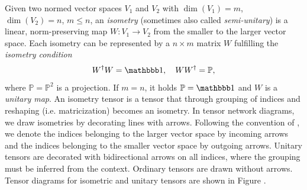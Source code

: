 Given two normed vector spaces $V_1$ and $V_2$ with $\dim\left(V_1\right) = m$, $\dim\left(V_2\right) = n$, $m \le n$, an \textit{isometry} (sometimes also called \textit{semi-unitary}) is a linear, norm-preserving map $W: V_1 \rightarrow V_2$ from the smaller to the larger vector space. Each isometry can be represented by a $n\times m$ matrix $W$ fulfilling the \textit{isometry condition}
\begin{equation}
	\label{eq:isometry_condition_general}
	W^\dagger W = \id, \quad WW^\dagger = \mathbb{P},
\end{equation}
where $\mathbb{P} = \mathbb{P}^2$ is a projection. If $m = n$, it holds $\mathbb{P} = \id$ and $W$ is a \textit{unitary map}. An isometry tensor is a tensor that through grouping of indices and reshaping (i.e. matricization) becomes an isometry. In tensor network diagrams, we draw isometries by decorating lines with arrows. Following the convention of \cite{cite:isometric_tensor_network_states_in_two_dimensions, cite:efficient_simulation_of_dynamics_in_two_dimensional_quantum_spin_systems}, we denote the indices belonging to the larger vector space by incoming arrows and the indices belonging to the smaller vector space by outgoing arrows. Unitary tensors are decorated with bidirectional arrows on all indices, where the grouping must be inferred from the context. Ordinary tensors are drawn without arrows. Tensor diagrams for isometric and unitary tensors are shown in Figure .\par
